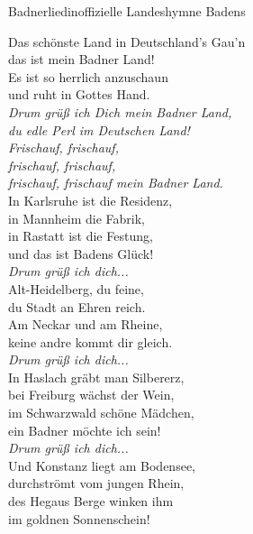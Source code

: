 
\begin{lied*}{Badnerlied}{inoffizielle Landeshymne Badens}

Das schönste Land in Deutschland's Gau'n\\
das ist mein Badner Land!\\
Es ist so herrlich anzuschaun\\
und ruht in Gottes Hand.\\

\textit{Drum grüß ich Dich mein Badner Land,\\
du edle Perl im Deutschen Land!\\
Frischauf, frischauf,\\
frischauf, frischauf,\\
frischauf, frischauf mein Badner Land.}\\

In Karlsruhe ist die Residenz,\\
in Mannheim die Fabrik,\\
in Rastatt ist die Festung,\\
und das ist Badens Glück!\\

\textit{Drum grüß ich dich...}\\

Alt-Heidelberg, du feine,\\
du Stadt an Ehren reich.\\
Am Neckar und am Rheine,\\
keine andre kommt dir gleich.\\

\textit{Drum grüß ich dich...}\\

In Haslach gräbt man Silbererz,\\
bei Freiburg wächst der Wein,\\
im Schwarzwald schöne Mädchen,\\
ein Badner möchte ich sein!\\

\textit{Drum grüß ich dich...}\\

Und Konstanz liegt am Bodensee,\\
durchströmt vom jungen Rhein,\\
des Hegaus Berge winken ihm\\
im goldnen Sonnenschein!\\


\end{lied*}
